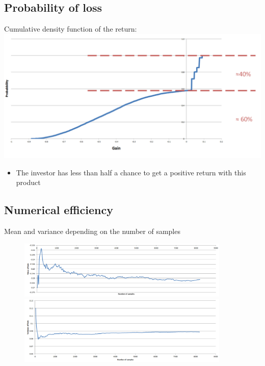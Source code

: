 \subsection{Probability of loss}
\begin{frame}
\myframetitle{}
Cumulative density function of the return: \\
\vspace{0.5cm}
\centering
\includegraphics[width=0.9\linewidth]{../Report/Gain}
\begin{itemize}
\item The investor has less than half a chance to get a positive return with this product
\end{itemize}
\end{frame}



\subsection{Numerical efficiency}
\begin{frame}
\myframetitle{}
Mean and variance depending on the number of samples
\begin{figure}
	\centering
	\includegraphics[width=0.9\textwidth]{../Report/Mean_of_the_gain} \\
	\includegraphics[width=0.9\textwidth]{../Report/Variance_of_the_gain}
\end{figure}
\end{frame}

